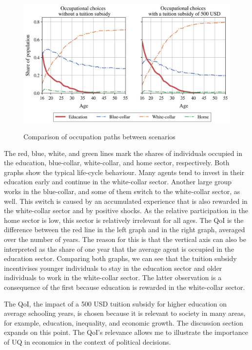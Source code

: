 \begin{figure}[H]
	\caption{Comparison of occupation paths between scenarios}
	\centering
	\includegraphics[scale=0.75]{../figures/occ_paths}
	\label{fig:paths}
\end{figure}
\noindent
The red, blue, white, and green lines mark the shares of individuals occupied in the education, blue-collar, white-collar, and home sector, respectively. Both graphs show the typical life-cycle behaviour. Many agents tend to invest in their education early and continue in the white-collar sector. Another large group works in the blue-collar, and some of them switch to the white-collar sector, as well. This switch is caused by an accumulated experience that is also rewarded in the white-collar sector and by positive shocks. As the relative participation in the home sector is low, this sector is relatively irrelevant for all ages.
The QoI is the difference between the red line in the left graph and in the right graph, averaged over the number of years. The reason for this is that the vertical axis can also be interpreted as the share of one year that the average agent is occupied in the education sector. Comparing both graphs, we can see that the tuition subsidy incentivises younger individuals to stay in the education sector and older individuals to work in the white-collar sector. The latter observation is a consequence of the first because education is rewarded in the white-collar sector.

The QoI, the impact of a 500 USD tuition subsidy for higher education on average schooling years, is chosen because it is relevant to society in many areas, for example, education, inequality, and economic growth. The discussion section expands on this point. The QoI's relevance allows me to illustrate the importance of UQ in economics in the context of political decisions.

